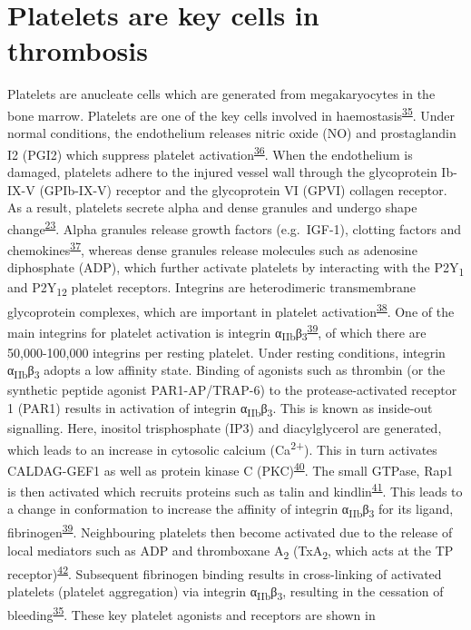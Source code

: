 \documentclass[11pt,twoside]{bristolthesis}
\begin{document}
\hypertarget{platelets-are-key-cells-in-thrombosis}{%
\section{Platelets are key cells in thrombosis}\label{platelets-are-key-cells-in-thrombosis}}

Platelets are anucleate cells which are generated from megakaryocytes in the bone marrow. Platelets are one of the key cells involved in haemostasis\textsuperscript{\protect\hyperlink{ref-Rivera2009}{35}}. Under normal conditions, the endothelium releases nitric oxide (NO) and prostaglandin I2 (PGI2) which suppress platelet activation\textsuperscript{\protect\hyperlink{ref-Yau2015}{36}}. When the endothelium is damaged, platelets adhere to the injured vessel wall through the glycoprotein Ib-IX-V (GPIb-IX-V) receptor and the glycoprotein VI (GPVI) collagen receptor. As a result, platelets secrete alpha and dense granules and undergo shape change\textsuperscript{\protect\hyperlink{ref-Badimon2012}{23}}. Alpha granules release growth factors (e.g.~IGF-1), clotting factors and chemokines\textsuperscript{\protect\hyperlink{ref-Gear2003}{37}}, whereas dense granules release molecules such as adenosine diphosphate (ADP), which further activate platelets by interacting with the P2Y\textsubscript{1} and P2Y\textsubscript{12} platelet receptors. Integrins are heterodimeric transmembrane glycoprotein complexes, which are important in platelet activation\textsuperscript{\protect\hyperlink{ref-Durrant2017a}{38}}. One of the main integrins for platelet activation is integrin α\textsubscript{IIb}β\textsubscript{3}\textsuperscript{\protect\hyperlink{ref-Huang2019}{39}}, of which there are 50,000-100,000 integrins per resting platelet. Under resting conditions, integrin α\textsubscript{IIb}β\textsubscript{3} adopts a low affinity state. Binding of agonists such as thrombin (or the synthetic peptide agonist PAR1-AP/TRAP-6) to the protease-activated receptor 1 (PAR1) results in activation of integrin α\textsubscript{IIb}β\textsubscript{3}. This is known as inside-out signalling. Here, inositol trisphosphate (IP3) and diacylglycerol are generated, which leads to an increase in cytosolic calcium (Ca\textsuperscript{2+}). This in turn activates CALDAG-GEF1 as well as protein kinase C (PKC)\textsuperscript{\protect\hyperlink{ref-Mehrbod2013}{40}}. The small GTPase, Rap1 is then activated which recruits proteins such as talin and kindlin\textsuperscript{\protect\hyperlink{ref-Durrant2017}{41}}. This leads to a change in conformation to increase the affinity of integrin α\textsubscript{IIb}β\textsubscript{3} for its ligand, fibrinogen\textsuperscript{\protect\hyperlink{ref-Huang2019}{39}}. Neighbouring platelets then become activated due to the release of local mediators such as ADP and thromboxane A\textsubscript{2} (TxA\textsubscript{2}, which acts at the TP receptor)\textsuperscript{\protect\hyperlink{ref-Offermanns2006}{42}}. Subsequent fibrinogen binding results in cross-linking of activated platelets (platelet aggregation) via integrin α\textsubscript{IIb}β\textsubscript{3}, resulting in the cessation of bleeding\textsuperscript{\protect\hyperlink{ref-Rivera2009}{35}}. These key platelet agonists and receptors are shown in 
\end{document}
